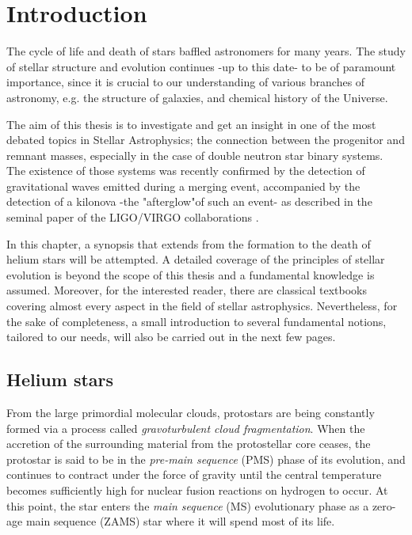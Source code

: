 \documentclass[../../main/thesis_msc.tex]{subfiles}
\begin{document}
    \chapter{Introduction}
    
		The cycle of life and death of stars  baffled astronomers for many years. The study of stellar structure and evolution continues -up to this date- to be of paramount importance, since it is crucial to our understanding of various branches of astronomy, e.g. the structure of galaxies, and chemical history of the Universe.
		
		The aim of this thesis is to investigate and get an insight in one of the most debated topics in Stellar Astrophysics; the connection between the progenitor and remnant masses, especially in the case of double neutron star binary systems. The existence of those systems was recently confirmed by the detection of gravitational waves emitted during a merging event, accompanied by the detection of a kilonova -the "afterglow"of such an event- as described in the seminal paper of the LIGO/VIRGO collaborations \citep{ligo}.
		
		In this chapter, a synopsis that extends from the formation to the death of helium stars will be attempted. A detailed coverage of the principles of stellar evolution is beyond the scope of this thesis and a fundamental knowledge is assumed. Moreover, for the interested reader, there are classical textbooks \citep{Kipp_book, Clayton, Prialnik, Eggleton_book} covering almost every aspect in the field of stellar astrophysics. Nevertheless, for the sake of completeness, a small introduction to several fundamental notions, tailored to our needs, will also be carried out in the next few pages. 
		

    
    
    \section{Helium stars}
    	
    	From the large primordial molecular clouds, protostars are being constantly formed via a process called \emph{gravoturbulent cloud fragmentation}. When the accretion of the surrounding material from the protostellar core ceases, the protostar is said to be in the \emph{pre-main sequence} (PMS) phase of its evolution, and continues to contract under the force of gravity until the central temperature becomes sufficiently high for nuclear fusion reactions on hydrogen to occur. At this point, the star enters the \emph{main sequence} (MS) evolutionary phase as a zero-age main sequence (ZAMS) star where it will spend most of its life.
    	
\end{document}
